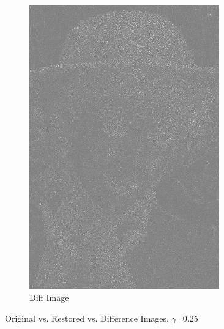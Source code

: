 \documentclass{article}
\begin{document}
\begin{figure}[!htb]
\begin{subfigure}{0.3\textwidth}
					\includegraphics[width=0.9\textwidth]{img03y_diff_1.png}
					\caption{Diff Image}
				\end{subfigure}
				\caption{Original vs. Restored vs. Difference Images, $\gamma$=0.25}
			\end{figure}
\end{document}
